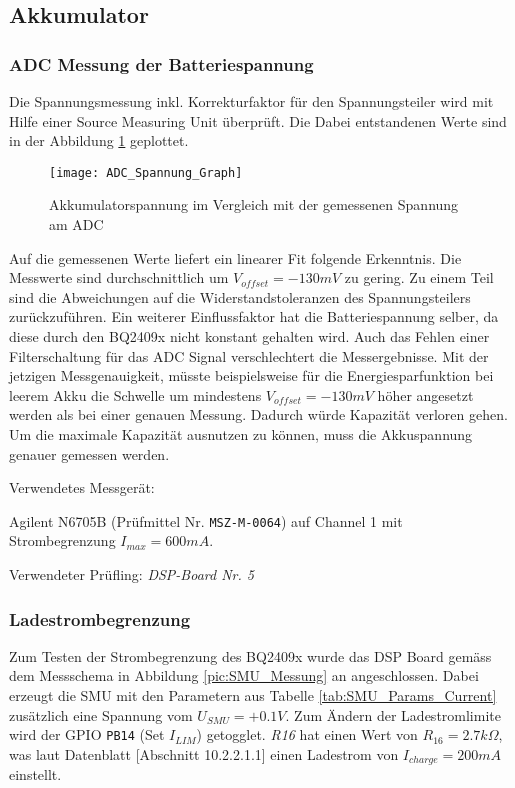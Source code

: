 \subsection{Akkumulator}
\label{sec:Valid_Batterie}

\subsubsection{ADC Messung der Batteriespannung}

Die Spannungsmessung inkl. Korrekturfaktor für den Spannungsteiler wird mit Hilfe einer Source Measuring Unit überprüft. Die Dabei entstandenen Werte sind in der Abbildung \ref{pic:ADC_Spannung_Graph} geplottet.

\begin{figure}[H]
	\centering
	\texttt{[image: ADC\_Spannung\_Graph]}
	\caption{Akkumulatorspannung im Vergleich mit der gemessenen Spannung am ADC}
	\label{pic:ADC_Spannung_Graph}
\end{figure}

Auf die gemessenen Werte liefert ein linearer Fit folgende Erkenntnis.
Die Messwerte sind durchschnittlich um $V_{offset}=-130\si{mV}$ zu gering.
Zu einem Teil sind die Abweichungen auf die Widerstandstoleranzen des Spannungsteilers zurückzuführen.
Ein weiterer Einflussfaktor hat die Batteriespannung selber, da diese durch den BQ2409x nicht konstant gehalten wird. Auch das Fehlen einer Filterschaltung für das ADC Signal verschlechtert die Messergebnisse.
Mit der jetzigen Messgenauigkeit, müsste beispielsweise für die Energiesparfunktion bei leerem Akku die Schwelle um mindestens $V_{offset}=-130\si{mV}$ höher angesetzt werden als bei einer genauen Messung. Dadurch würde Kapazität verloren gehen. Um die maximale Kapazität ausnutzen zu können, muss die Akkuspannung genauer gemessen werden.

Verwendetes Messgerät:

Agilent N6705B (Prüfmittel Nr. \texttt{MSZ-M-0064}) auf Channel 1 mit Strombegrenzung $I_{max}=600\si{mA}$.

Verwendeter Prüfling: \textit{DSP-Board Nr. 5}

\subsubsection{Ladestrombegrenzung}

Zum Testen der Strombegrenzung des BQ2409x wurde das DSP Board gemäss dem Messschema in Abbildung \ref{pic:SMU_Messung} an angeschlossen.
Dabei erzeugt die SMU mit den Parametern aus Tabelle \ref{tab:SMU_Params_Current} zusätzlich eine Spannung vom $U_{SMU}=+0.1\si{V}$.
Zum Ändern der Ladestromlimite wird der GPIO \texttt{PB14} (Set $I_{LIM}$) getogglet.
\textit{R16} hat einen Wert von $R_{16}=2.7k\Omega$, was laut Datenblatt \cite{bq2409x}[Abschnitt 10.2.2.1.1] einen Ladestrom von $I_{charge}=200\si{mA}$ einstellt.

